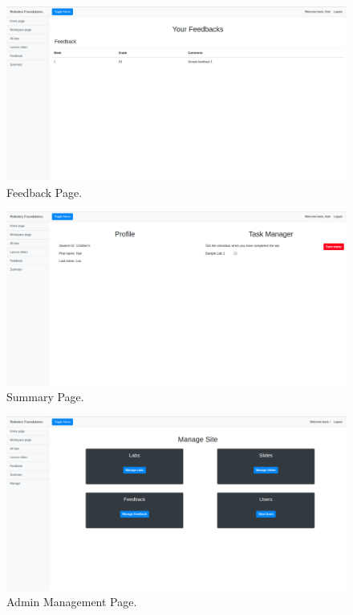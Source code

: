 \documentclass{l4proj}
\begin{document}
\begin{appendices}
\begin{figure}[h]
    \centering
    \includegraphics[scale=0.20]{images/feedback_page.png}
    \caption{Feedback Page.}
\end{figure}


\begin{figure}[h]
    \centering
    \includegraphics[scale=0.20]{images/summary_page.png}
    \caption{Summary Page.}
\end{figure}

\begin{figure}[h]
    \centering
    \includegraphics[scale=0.20]{images/admin_manage.png}
    \caption{Admin Management Page.}
\end{figure}


\end{appendices}
\end{document}
